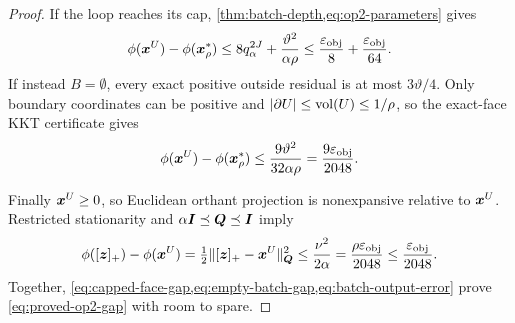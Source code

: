 \begin{proof}
If the loop reaches its cap, \cref{thm:batch-depth,eq:op2-parameters} gives
\begin{equation}
 \phi(\bm{x}^U)-\phi(\bm{x}_\rho^*)
 \leq8q_\alpha^{2J}+\frac{\vartheta^2}{\alpha\rho}
 \leq\frac{\varepsilon_{\mathrm{obj}}}{8}+\frac{\varepsilon_{\mathrm{obj}}}{64}.
 \label{eq:capped-face-gap}
\end{equation}
If instead $B=\emptyset$, every exact positive outside residual is at most
$3\vartheta/4$.  Only boundary coordinates can be positive and
$|\partial U|\leq\operatorname{vol}(U)\leq1/\rho$, so the exact-face KKT certificate gives
\begin{equation}
 \phi(\bm{x}^U)-\phi(\bm{x}_\rho^*)
 \leq\frac{9\vartheta^2}{32\alpha\rho}
 =\frac{9\varepsilon_{\mathrm{obj}}}{2048}.
 \label{eq:empty-batch-gap}
\end{equation}

Finally $\bm{x}^U\geq0$, so Euclidean orthant projection is nonexpansive relative
to $\bm{x}^U$.  Restricted stationarity and
$\alpha\bm{I}\preceq\bm{Q}\preceq\bm{I}$ imply
\begin{equation}
 \phi([\bm{z}]_+)-\phi(\bm{x}^U)
 =\tfrac12\lVert[\bm{z}]_+-\bm{x}^U\rVert_{\bm{Q}}^2
 \leq\frac{\nu^2}{2\alpha}
 =\frac{\rho\varepsilon_{\mathrm{obj}}}{2048}
 \leq\frac{\varepsilon_{\mathrm{obj}}}{2048}.
 \label{eq:batch-output-error}
\end{equation}
Together, \cref{eq:capped-face-gap,eq:empty-batch-gap,eq:batch-output-error}
prove \cref{eq:proved-op2-gap} with room to spare.


\end{proof}
